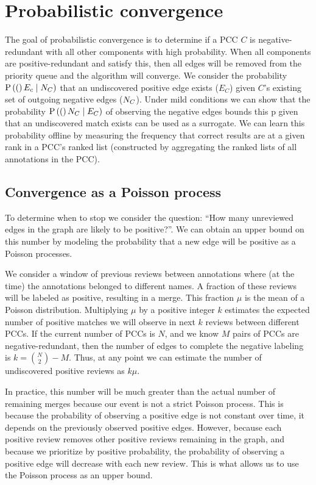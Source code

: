 \section{Probabilistic convergence}\label{sec:coverge}

The goal of probabilistic convergence is to determine if a PCC $C$ is
  negative-redundant with all other components with high probability.
When all components are positive-redundant and satisfy this, then all edges
  will be removed from the priority queue and the algorithm will converge.
We consider the probability $\mathbin{\mathbin{\operatorname{P}}}\left((\right)E_c \mid N_C)$ that an undiscovered
  positive edge exists ($E_C$) given $C$'s existing set of outgoing negative
  edges ($N_C$).
Under mild conditions %
we can show that the probability $\mathbin{\mathbin{\operatorname{P}}}\left((\right)N_C \mid E_C)$ of observing the
  negative edges bounds this p given that an undiscovered match exists can be
  used as a surrogate.
We can learn this probability offline by measuring the frequency that correct
  results are at a given rank in a PCC's ranked list (constructed by aggregating
  the ranked lists of all annotations in the PCC).


\subsection{Convergence as a Poisson process}

To determine when to stop we consider the question:
``How many unreviewed edges in the graph are likely to be positive?''.
We can obtain an upper bound on this number by modeling the probability that a
  new edge will be positive as a Poisson processes.

We consider a window of previous reviews between annotations where (at the
  time) the annotations belonged to different names.
A fraction of these reviews will be labeled as positive, resulting in a merge.
This fraction $\mu$ is the mean of a Poisson distribution.
Multiplying $\mu$ by a positive integer $k$ estimates the expected number of
  positive matches we will observe in next $k$ reviews between different PCCs.
If the current number of PCCs is $N$, and we know $M$ pairs of PCCs are
  negative-redundant, then the number of edges to complete the negative labeling
  is $k=\binom{N}{2} - M$.
Thus, at any point we can estimate the number of undiscovered positive reviews
  as $k\mu$.

In practice, this number will be much greater than the actual number of
  remaining merges because our event is not a strict Poisson process.
This is because the probability of observing a positive edge is not constant
  over time, it depends on the previously observed positive edges.
However, because each positive review removes other positive reviews remaining
  in the graph, and because we prioritize by positive probability, the
  probability of observing a positive edge will decrease with each new review.
This is what allows us to use the Poisson process as an upper bound.




